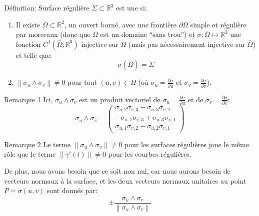 \documentclass[a4paper]{article}
\begin{document}
\begin{parag}{Définition: Surface régulière}
    $\Sigma \subset \mathbb{R}^3$ est une  si:
    \begin{enumerate}
        \item Il existe $\Omega \subset \mathbb{R}^2$, un ouvert borné, avec une frontière $\partial \Omega$ simple et régulière par morceaux (donc que $\Omega$ est un domaine ``sans trou'') et $\sigma: \bar{\Omega}\mapsto \mathbb{R}^3$ une fonction $C^1\left(\bar{\Omega};\mathbb{R}^3\right)$ injective sur $\Omega$ (mais pas nécessairement injective sur $\bar{\Omega}$) et telle que: 
        \[\sigma\left(\bar{\Omega}\right) = \Sigma\]
        
        \item $\left\|\sigma_u \wedge \sigma_v\right\| \neq 0$ pour tout $\left(u, v\right) \in \Omega$ (où $\sigma_u = \frac{\partial \sigma}{\partial u} $ et $\sigma_v = \frac{\partial \sigma}{\partial v} $).
    \end{enumerate}



    \begin{subparag}{Remarque 1}
        Ici, $\sigma_u \wedge \sigma_v$ est un produit vectoriel de $\sigma_u = \frac{\partial \sigma}{\partial u}$ et de $\sigma_v = \frac{\partial \sigma}{\partial v} $: 
        \[\sigma_u \wedge \sigma_v = \begin{pmatrix} \sigma_{u, 2} \sigma_{v, 3} - \sigma_{u, 3} \sigma_{v, 2} \\ -\sigma_{u,  1} \sigma_{v,3} + \sigma_{u, 3} \sigma_{v, 1} \\ \sigma_{u, 1} \sigma_{v, 2} - \sigma_{u, 2} \sigma_{v, 1} \end{pmatrix} \]
    \end{subparag}

    \begin{subparag}{Remarque 2}
        Le terme $\left\|\sigma_u \wedge \sigma_v\right\| \neq 0$ pour les surfaces régulières joue le même rôle que le terme $\left\|\gamma'\left(t\right)\right\| \neq 0$ pour les courbes régulières.

        De plus, nous avons besoin que ce soit non nul, car nous aurons besoin de vecteurs normaux à la surface, et les deux vecteurs normaux unitaires au point $P = \sigma\left(u, v\right)$ sont donnés par: 
        \[\pm \frac{\sigma_u \wedge \sigma_v}{\left\|\sigma_u \wedge \sigma_v\right\|}\]

    \end{subparag}
\end{parag}
\end{document}
